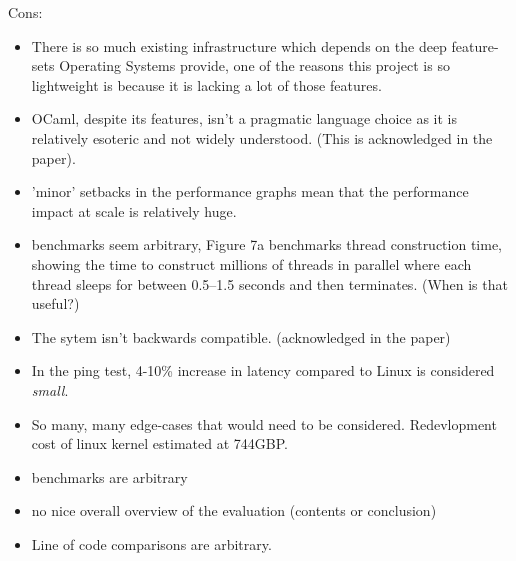\documentclass[11pt]{article}
\begin{document}
Cons:

\begin{itemize}





    \item There is so much existing infrastructure which depends on the deep
    feature-sets Operating Systems provide, one of the reasons this project is
    so lightweight is because it is lacking a lot of those features.

    \item OCaml, despite its features, isn't a pragmatic language choice as it
    is relatively esoteric and not widely understood. (This is acknowledged in
    the paper).

    \item 'minor' setbacks in the performance graphs mean that the performance
    impact at scale is relatively huge.

    \item benchmarks seem arbitrary, Figure 7a benchmarks thread construction
    time, showing the time to construct millions of threads in parallel where
    each thread sleeps for between 0.5–1.5 seconds and then terminates. (When is that useful?)

    \item The sytem isn't backwards compatible. (acknowledged in the paper)

    \item In the ping test, 4-10\% increase in latency compared to Linux is
    considered \textit{small}.

    \item So many, many edge-cases that would need to be considered.
    Redevlopment cost of linux kernel estimated at 744GBP. %

    \item benchmarks are arbitrary

    \item no nice overall overview of the evaluation (contents or conclusion)

    \item Line of code comparisons are arbitrary.


\end{itemize}
\end{document}
